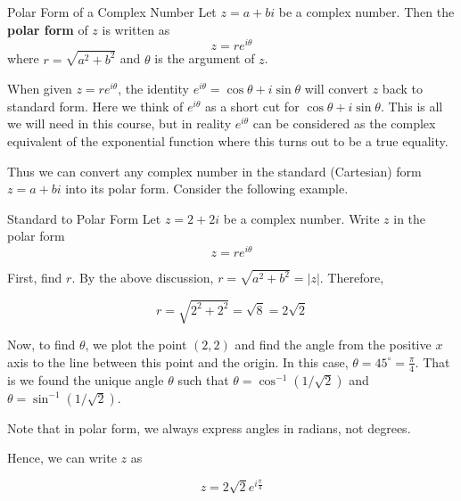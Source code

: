 \begin{definition}{Polar Form of a Complex Number}\label{def:polarform}
Let $z = a + bi$ be a complex number. Then the \textbf{polar form} of $z$ is written as 
\[
z = re^{i\theta}
\]
where $r = \sqrt{a^2 + b^2}$ and $\theta$ is the argument of $z$. 
\end{definition}

When given $z = re^{i\theta}$, the identity $e^{i\theta} = \cos\theta + i \sin\theta$ will convert $z$ back to standard form. Here we think of $ e^{i \theta}$ as a short cut for $ \cos \theta
+i\sin \theta$. This is all we will need in this course, but in
reality $e^{i \theta}$ can be considered as the complex equivalent of
the exponential function where this turns out to be a true equality.

\begin{center}
\end{center}

Thus we can convert any complex number in the standard (Cartesian) form $z = a+bi$
into its polar form. Consider the following example.

\begin{example}{Standard to Polar Form}\label{exa:polarform}
Let $z = 2 + 2i$ be a complex number. 
Write $z$ in the polar form 
\begin{equation*}
z = re^{i \theta}
\end{equation*}
\end{example}

\begin{solution}
First, find $r$.
By the above discussion, $r=\sqrt{
a^{2}+b^{2}} = |z|$. Therefore,

\begin{equation*}
r = \sqrt{2^{2} + 2^{2}} = \sqrt{8} =2\sqrt{2}
\end{equation*}

Now, to find $\theta$, we plot the point $\left( 2, 2 \right)$ and
find the angle from the positive $x$ axis to the line between this
point and the origin. In this case, $\theta = 45^{\circ} =
\frac{\pi}{4}$.  That is we found the unique angle $\theta$ such that 
$\theta = \cos^{-1}(1/\sqrt{2})$ and $\theta = \sin^{-1}(1/\sqrt{2})$. 

Note that in polar form, we always express angles in radians, not degrees.

Hence, we can write $z$ as

\begin{equation*}
z = 2\sqrt{2} e^{i\frac{\pi}{4}}
\end{equation*}

\end{solution}

